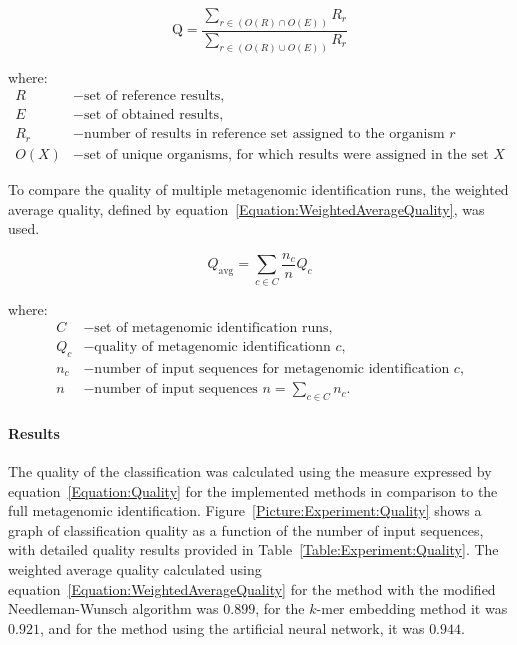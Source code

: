 \documentclass[pdflatex,sn-vancouver-num]{sn-jnl}%
\begin{document}
            \begin{equation}
                \text{Q} = \frac{
                    \sum_{r \in (O(R) \cap O(E))} R_{r}
                }{
                    \sum_{r \in (O(R) \cup O(E))} R_{r}
                }
                \label{Equation:Quality}
            \end{equation}

            where:
            \begin{align*}
                R &- \text{set of reference results,} \\
                E &- \text{set of obtained results,} \\
                R_{r} &- \text{number of results in reference set assigned to the organism $r$} \\
                O(X) &- \text{set of unique organisms, for which results were assigned in the set $X$}
            \end{align*}

            To compare the quality of multiple metagenomic identification runs, the weighted average quality, defined by equation~\ref{Equation:WeightedAverageQuality}, was used.

            \begin{equation}
                Q_{\text{avg}} = \sum_{c \in C} \frac{n_c}{n} Q_c
                \label{Equation:WeightedAverageQuality}
            \end{equation}

            where:
            \begin{align*}
            C &- \text{set of metagenomic identification runs,} \\
            Q_c &- \text{quality of metagenomic identificationn $c$,} \\
            n_c &- \text{number of input sequences for metagenomic identification $c$,}\\
            n   &- \text{number of input sequences $n = \sum_{c \in C} n_{c}.$}
            \end{align*}



                \paragraph{Results}
                The quality of the classification was calculated using the measure expressed by equation~\ref{Equation:Quality} for the implemented methods in comparison to the full metagenomic identification. Figure~\ref{Picture:Experiment:Quality} shows a graph of classification quality as a function of the number of input sequences, with detailed quality results provided in Table~\ref{Table:Experiment:Quality}. The weighted average quality calculated using equation~\ref{Equation:WeightedAverageQuality} for the method with the modified Needleman-Wunsch algorithm was $0.899$, for the $k$-mer embedding method it was $0.921$, and for the method using the artificial neural network, it was $0.944$.
\end{document}

